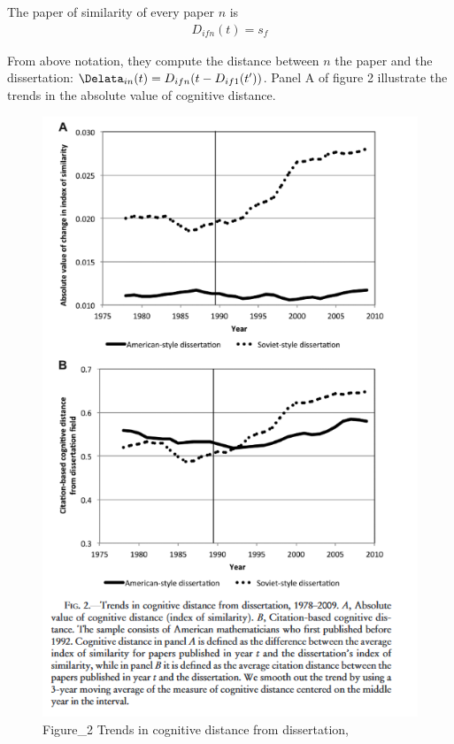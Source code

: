 \documentclass[../root]{subfiles}
\begin{document}
    The paper of similarity of every paper $n$ is 
    \begin{align}
        D_{ifn} (t) = s_f
    \end{align}
    
    From above notation, they compute the distance between $n$ the paper and the dissertation: $\Delata_{in}(t) = D_{ifn}(t - D_{if1}(t'))$.  
    Panel A of figure 2 illustrate the trends in the absolute value of cognitive distance.
    
    \begin{figure}
        \centering
        \includegraphics[width = \linewidth]{_images/0918sugiyama/Figure_2.png}
        \caption{Figure_2 Trends in cognitive distance from dissertation,}
        \label{fig:my_label}
    \end{figure}
    
\end{document}
